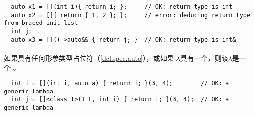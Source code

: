 \begin{example}
  \begin{lstlisting}
  auto x1 = [](int i){ return i; };     // OK: return type is int
  auto x2 = []{ return { 1, 2 }; };     // error: deducing return type from braced-init-list
  int j;
  auto x3 = []()->auto&& { return j; }  // OK: return type is int&
  \end{lstlisting}
\end{example}

\paragraph{} %
如果具有任何形参类型占位符（\ref{dcl.spec.auto}），或如果
$\lambda$具有一个，则该$\lambda$是一个
。

\begin{example}
  \begin{lstlisting}
  int i = [](int i, auto a) { return i; }(3, 4);        // OK: a generic lambda
  int j = []<class T>(T t, int i) { return i; }(3, 4);  // OK: a generic lambda
  \end{lstlisting}
\end{example}

